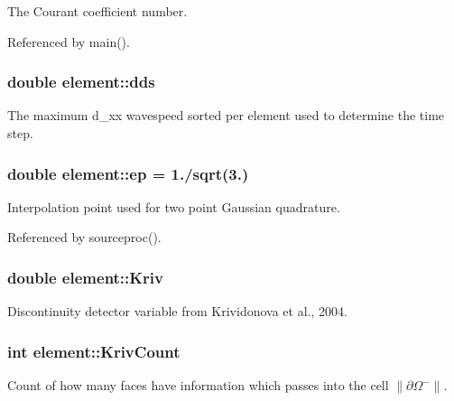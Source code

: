 The Courant coefficient number. 



Referenced by main().

\subsubsection[{dds}]{\setlength{\rightskip}{0pt plus 5cm}double element\-::dds}\label{classelement_a2cff653cbc92e0ee758478899d177b4e}


The maximum d\-\_\-xx wavespeed sorted per element used to determine the time step. 

\subsubsection[{ep}]{\setlength{\rightskip}{0pt plus 5cm}double element\-::ep = 1./sqrt(3.)\hspace{0.3cm}{\ttfamily [static]}}\label{classelement_a38e6f5a1b5f9f18348dbc73c55b01dd8}


Interpolation point used for two point Gaussian quadrature. 



Referenced by sourceproc().

\subsubsection[{Kriv}]{\setlength{\rightskip}{0pt plus 5cm}double element\-::\-Kriv}\label{classelement_abe57494fc7bfc89bde32781336cca651}


Discontinuity detector variable from Krividonova et al., 2004. 

\subsubsection[{Kriv\-Count}]{\setlength{\rightskip}{0pt plus 5cm}int element\-::\-Kriv\-Count}\label{classelement_ab8b596c587764a871d0ad0ec9e01636d}


Count of how many faces have information which passes into the cell $\| \partial\Omega^- \|$. 

